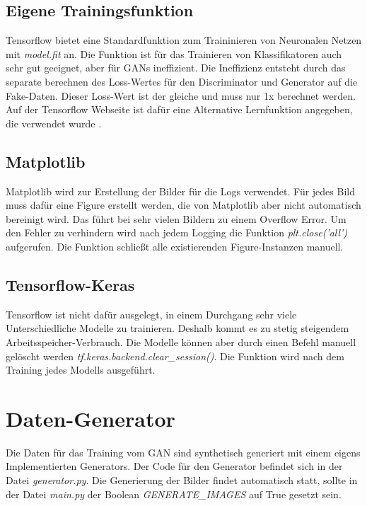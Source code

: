 \subsection{Eigene Trainingsfunktion}
Tensorflow bietet eine Standardfunktion zum Traininieren von Neuronalen Netzen mit \textit{model.fit} an.
Die Funktion ist für das Trainieren von Klassifikatoren auch sehr gut geeignet, aber für GANs ineffizient.
Die Ineffizienz entsteht durch das separate berechnen des Loss-Wertes für den Discriminator und Generator auf die Fake-Daten.
Dieser Loss-Wert ist der gleiche und muss nur 1x berechnet werden.
Auf der Tensorflow Webseite ist dafür eine Alternative Lernfunktion angegeben, die verwendet wurde \cite{tensorflow-gan-learn-step}.

\subsection{Matplotlib}
Matplotlib wird zur Erstellung der Bilder für die Logs verwendet.
Für jedes Bild muss dafür eine Figure erstellt werden, die von Matplotlib aber nicht automatisch bereinigt wird.
Das führt bei sehr vielen Bildern zu einem Overflow Error.
Um den Fehler zu verhindern wird nach jedem Logging die Funktion \textit{plt.close('all')} aufgerufen.
Die Funktion schließt alle existierenden Figure-Instanzen manuell.

\subsection{Tensorflow-Keras}
Tensorflow ist nicht dafür ausgelegt, in einem Durchgang sehr viele Unterschiedliche Modelle zu trainieren.
Deshalb kommt es zu stetig steigendem Arbeitsspeicher-Verbrauch.
Die Modelle können aber durch einen Befehl manuell gelöscht werden \textit{tf.keras.backend.clear\_session()}.
Die Funktion wird nach dem Training jedes Modells ausgeführt.

\section{Daten-Generator}
Die Daten für das Training vom GAN sind synthetisch generiert mit einem eigens Implementierten Generators.
Der Code für den Generator befindet sich in der Datei \textit{generator.py}.
Die Generierung der Bilder findet automatisch statt, sollte in der Datei \textit{main.py} der Boolean \textit{GENERATE\_IMAGES} auf True gesetzt sein.
\newline

